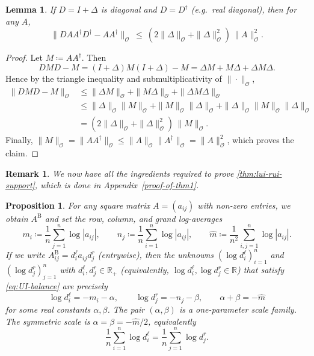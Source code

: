 \documentclass[11pt,a4paper]{article}
\newtheorem{lemma}[theorem]{Lemma}
\newtheorem{proposition}[theorem]{Proposition}
\newtheorem{remark}{Remark}[section]
\newcommand{\be}{\begin{equation}}
\newcommand{\ee}{\end{equation}}
\newcommand{\op}{\mathcal{O}}
\begin{document}
\begin{lemma}\label{lem:cov-op}
If $D=I+\Delta$ is diagonal and $D=D^\dagger$ (e.g.\ real diagonal), then for any $A$,
\begin{equation}
\|DAA^\dagger D^\dagger-AA^\dagger\|_{\op}\ \le\ (2\|\Delta\|_{\op}+\|\Delta\|_{\op}^2)\,\|A\|_{\op}^2.
\end{equation}
\end{lemma}
\begin{proof}
Let $M\coloneq AA^\dagger$. Then
\be
DMD-M=(I+\Delta)M(I+\Delta)-M=\Delta M + M\Delta + \Delta M\Delta.
\ee
Hence by the triangle inequality and submultiplicativity of $\|\cdot\|_{\op}$,
\begin{align}
\|DMD-M\|_{\op}
&\le \|\Delta M\|_{\op} + \|M\Delta\|_{\op} + \|\Delta M\Delta\|_{\op} \\
&\le \|\Delta\|_{\op}\|M\|_{\op} + \|M\|_{\op}\|\Delta\|_{\op} + \|\Delta\|_{\op}\|M\|_{\op}\|\Delta\|_{\op} \\
&= (2\|\Delta\|_{\op}+\|\Delta\|_{\op}^2)\,\|M\|_{\op}.
\end{align}
Finally, $\|M\|_{\op}=\|AA^\dagger\|_{\op}\le \|A\|_{\op}\|A^\dagger\|_{\op}=\|A\|_{\op}^2$, which proves the claim.
\end{proof}
\begin{remark}
We now have all the ingredients required to prove \cref{thm:lui-rui-support}, which is done in Appendix~\ref{proof-of-thm1}.
\end{remark}
\begin{proposition}\label{prop:gauge-fully}
For any square matrix $A = (a_{ij})$ with non-zero entries, we obtain $A^\mathrm{B}$ and set the row, column, and grand log-averages \begin{equation}\label{eq:row-col-gra-mean-rep}
m_i\coloneq \frac1n\sum_{j=1}^n\log|a_{ij}|,
\qquad
n_j\coloneq \frac1n\sum_{i=1}^n\log|a_{ij}|,
\qquad
\hat{m}\coloneq \frac1{n^2}\sum_{i,j=1}^n\log|a_{ij}|.
\end{equation}
If we write $A^\mathrm{B}_{ij}=d^\ell_i a_{ij} {d^r_j}$ (entrywise), then the unknowns $(\log d^\ell_i)_{i=1}^n$ and $(\log {d^r_j})_{j=1}^n$ with $d^\ell_i,{d^r_j}\in\mathbb R_{+}$ (equivalently, $\log d^\ell_i,\log {d^r_j}\in\mathbb R$) that satisfy \cref{eq:UI-balance} are precisely
\begin{equation}
\log d^\ell_i=-m_i-\alpha,\qquad \log {d^r_j}=-n_j-\beta,\qquad \alpha+\beta=-\hat{m} 
\end{equation}
for some real constants $\alpha,\beta$. The pair $(\alpha,\beta)$ is a one-parameter \emph{scale family}. The \emph{symmetric scale} is $\alpha=\beta=-\hat{m}/2$, equivalently
\begin{equation}
\frac1n\sum_{i=1}^n \log d^\ell_i=\frac1n\sum_{j=1}^n \log {d^r_j}.
\end{equation}
\end{proposition}
\end{document}

